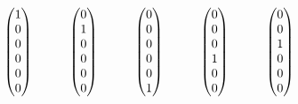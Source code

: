 \begin{equation*}
	\begin{pmatrix}
		1 \\ 0 \\ 0 \\ 0 \\ 0 \\ 0
	\end{pmatrix}
	\hspace{10 mm} 
	\begin{pmatrix}
		0 \\ 1 \\ 0 \\ 0 \\ 0 \\ 0
	\end{pmatrix}
	\hspace{10 mm} 
	\begin{pmatrix}
		0 \\ 0 \\ 0 \\ 0 \\ 0 \\ 1
	\end{pmatrix}
	\hspace{10 mm} 
	\begin{pmatrix}
		0 \\ 0 \\ 0 \\ 1 \\ 0 \\ 0
	\end{pmatrix}
	\hspace{10 mm} 
	\begin{pmatrix}
		0 \\ 0 \\ 1 \\ 0 \\ 0 \\ 0
	\end{pmatrix}
\end{equation*}

